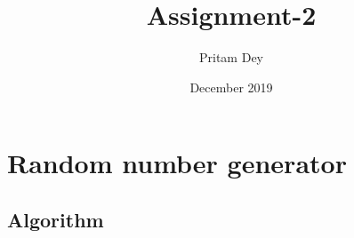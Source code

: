 \documentclass{article}
\title{Assignment-2}
\author{Pritam Dey }
\date{December 2019}
\begin{document}
\maketitle

\section{Random number generator}

\subsection{Algorithm}

\begin{figure}[ht]
\center
\begin{minipage}{.8\linewidth}
\begin{algorithm}[H]
\SetAlgoLined
{}
\end{algorithm}
\end{minipage}
\end{figure}
\end{document}
